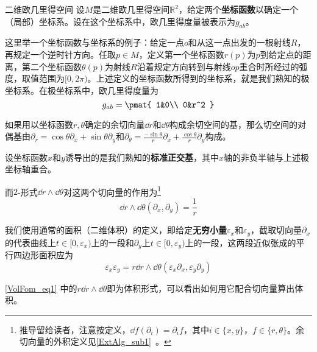 \begin{example}{二维欧几里得空间}\label{VolFom_ex1}
设$M$是二维欧几里得空间$\mathbb{R}^2$，给定两个\textbf{坐标函数}以确定一个（局部）坐标系。设在这个坐标系中，欧几里得度量被表示为$g_{ab}$。

这里举一个坐标函数与坐标系的例子：给定一点$o$和从这一点出发的一根射线$R$，再规定一个逆时针方向。任取$p\in M$，定义第一个坐标函数$r(p)$为$p$到给定点的距离，第二个坐标函数$\theta(p)$为射线$R$沿着规定方向转到与射线$op$重合时所经过的弧度，取值范围为$[0, 2\pi)$。上述定义的坐标函数所得到的坐标系，就是我们熟知的极坐标系。在极坐标系中，欧几里得度量为
\begin{equation}
g_{ab}=\pmat{
    1&0\\
    0&r^2
}
\end{equation}


如果用以坐标函数$r, \theta$确定的余切向量$\dd r$和$\dd \theta$构成余切空间的基，那么切空间的对偶基由$\partial_r=\cos\theta\partial_x+\sin\theta\partial_y$和$\partial_\theta=\frac{-\sin\theta}{r}\partial_x+\frac{\cos\theta}{r}\partial_y$构成。



设坐标函数$x$和$y$诱导出的是我们熟知的\textbf{标准正交基}，其中$x$轴的非负半轴与上述极坐标轴重合。





而$2$-形式$\dd r\wedge\dd \theta$对这两个切向量的作用为\footnote{推导留给读者，注意按定义，$\dd f(\partial_i)=\partial_i f$，其中$i\in\{x, y\}$，$f\in\{r, \theta\}$。余切向量的外积定义见\autoref{ExtAlg_sub1}~。}
\begin{equation}
\dd r\wedge\dd \theta(\partial_x, \partial_y) = \frac{1}{r}
\end{equation}

我们使用通常的面积（二维体积）的定义，即给定\textbf{无穷小量}$\varepsilon_x$和$\varepsilon_y$，截取切向量$\partial_x$的代表曲线上$t\in[0, \varepsilon_x)$上的一段和$\partial_y$上$t\in[0, \varepsilon_y)$上的一段，这两段近似张成的平行四边形面积应为
\begin{equation}\label{VolFom_eq1}
\varepsilon_x\varepsilon_y = r\dd r\wedge\dd \theta(\varepsilon_x\partial_x, \varepsilon_y\partial_y)
\end{equation}


\autoref{VolFom_eq1} 中的$r\dd r\wedge\dd \theta$即为体积形式，可以看出如何用它配合切向量算出体积。


\end{example}



